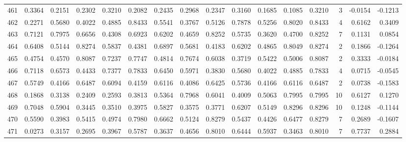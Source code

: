 \begin{tabular}{lrrrrrrrrrrrrrrr}
461 &      0.3364 &  0.2151 &  0.2302 &  0.3210 &  0.2082 &  0.2435 &  0.2968 &  0.2347 &  0.3160 &  0.1685 &   0.1085 &     0.3210 &      3 &                   -0.0154 &                    -0.1213 \\
462 &      0.2271 &  0.5680 &  0.4022 &  0.4885 &  0.8433 &  0.5541 &  0.3767 &  0.5126 &  0.7878 &  0.5256 &   0.8020 &     0.8433 &      4 &                    0.6162 &                     0.3409 \\
463 &      0.7121 &  0.7975 &  0.6656 &  0.4308 &  0.6923 &  0.6202 &  0.4659 &  0.8252 &  0.5735 &  0.3620 &   0.4700 &     0.8252 &      7 &                    0.1131 &                     0.0854 \\
464 &      0.6408 &  0.5144 &  0.8274 &  0.5837 &  0.4381 &  0.6897 &  0.5681 &  0.4183 &  0.6202 &  0.4865 &   0.8049 &     0.8274 &      2 &                    0.1866 &                    -0.1264 \\
465 &      0.4754 &  0.4570 &  0.8087 &  0.7237 &  0.7747 &  0.4814 &  0.7674 &  0.6038 &  0.3719 &  0.5422 &   0.5006 &     0.8087 &      2 &                    0.3333 &                    -0.0184 \\
466 &      0.7118 &  0.6573 &  0.4433 &  0.7377 &  0.7833 &  0.6450 &  0.5971 &  0.3830 &  0.5680 &  0.4022 &   0.4885 &     0.7833 &      4 &                    0.0715 &                    -0.0545 \\
467 &      0.5749 &  0.4166 &  0.6487 &  0.6094 &  0.4159 &  0.6116 &  0.4086 &  0.6425 &  0.5736 &  0.4166 &   0.6116 &     0.6487 &      2 &                    0.0738 &                    -0.1583 \\
468 &      0.1868 &  0.3138 &  0.2409 &  0.2593 &  0.3813 &  0.5364 &  0.7968 &  0.6041 &  0.4009 &  0.5063 &   0.7995 &     0.7995 &     10 &                    0.6127 &                     0.1270 \\
469 &      0.7048 &  0.5904 &  0.3445 &  0.3510 &  0.3975 &  0.5827 &  0.3575 &  0.3771 &  0.6207 &  0.5149 &   0.8296 &     0.8296 &     10 &                    0.1248 &                    -0.1144 \\
470 &      0.5590 &  0.3983 &  0.5415 &  0.4974 &  0.7980 &  0.6662 &  0.5124 &  0.8279 &  0.5437 &  0.4426 &   0.6477 &     0.8279 &      7 &                    0.2689 &                    -0.1607 \\
471 &      0.0273 &  0.3157 &  0.2695 &  0.3967 &  0.5787 &  0.3637 &  0.4656 &  0.8010 &  0.6444 &  0.5937 &   0.3463 &     0.8010 &      7 &                    0.7737 &                     0.2884 \\

\end{tabular}
